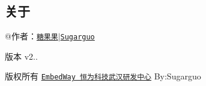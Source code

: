 \subsection*{关于}


\begin{DoxyItemize}
\item @作者：\href{http://www.sugarguo.com/}{\tt 糖果果$\vert$\-Sugarguo}
\item 
\item \begin{DoxyVersion}{版本}
v2..
\end{DoxyVersion}

\item \begin{DoxyCopyright}{版权所有}
\href{http://www.embedway.com/em/}{\tt Embed\-Way 恒为科技武汉研发中心} By\-:Sugarguo 
\end{DoxyCopyright}

\end{DoxyItemize}